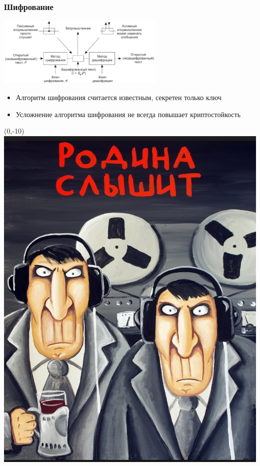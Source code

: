 \documentclass{../../slides-style}
\begin{document}
    \begin{frame}
        \frametitle{Шифрование}
        \begin{center}
            \includegraphics[width=0.6\textwidth]{cryptography.png}
        \end{center}
        \begin{itemize}
            \item Алгоритм шифрования считается известным, секретен только ключ
            \item Усложнение алгоритма шифрования не всегда повышает криптостойкость
        \end{itemize}
        \begin{textblock}{2.5}(0,-10)
            \includegraphics[width=\textwidth]{youAreBeingWatched.png}
        \end{textblock}
    \end{frame}
\end{document}
